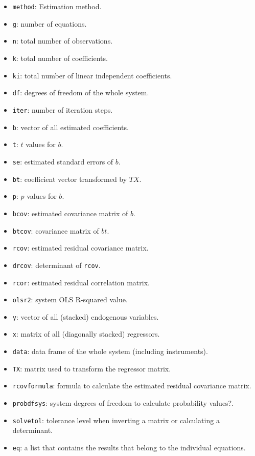 \begin{itemize}
\item \texttt{method}: Estimation method. 
\item \texttt{g}: number of equations.
\item \texttt{n}: total number of observations.
\item \texttt{k}: total number of coefficients.
\item \texttt{ki}: total number of linear independent coefficients.
\item \texttt{df}: degrees of freedom of the whole system.
\item \texttt{iter}: number of iteration steps.
\item \texttt{b}: vector of all estimated coefficients.
\item \texttt{t}: $t$ values for $b$.
\item \texttt{se}: estimated standard errors of $b$.
\item \texttt{bt}: coefficient vector transformed by $TX$.
\item \texttt{p}: $p$ values for $b$.
\item \texttt{bcov}: estimated covariance matrix of $b$.
\item \texttt{btcov}: covariance matrix of $bt$.
\item \texttt{rcov}: estimated residual covariance matrix.
\item \texttt{drcov}: determinant of \texttt{rcov}.
\item \texttt{rcor}: estimated residual correlation matrix.
\item \texttt{olsr2}: system OLS R-squared value.
\item \texttt{y}: vector of all (stacked) endogenous variables.
\item \texttt{x}: matrix of all (diagonally stacked) regressors.
\item \texttt{data}: data frame of the whole system (including instruments).
\item \texttt{TX}: matrix used to transform the regressor matrix.
\item \texttt{rcovformula}: formula to calculate the estimated residual covariance matrix.
\item \texttt{probdfsys}: system degrees of freedom to calculate probability values?.
\item \texttt{solvetol}: tolerance level when inverting a matrix or calculating a determinant.
\item \texttt{eq}: a list that contains the results that belong to the individual equations.

\end{itemize}
